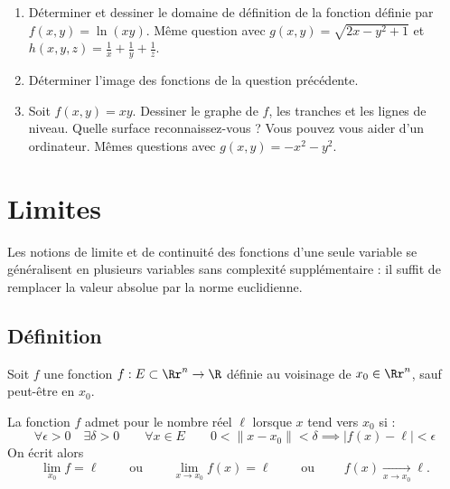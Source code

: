 \documentclass[11pt, class=report,crop=false]{standalone}
\begin{document}
 
\begin{miniexercices}
\sauteligne
\begin{enumerate}
  \item Déterminer et dessiner le domaine de définition de la fonction définie par $f(x,y) = \ln(xy)$.
  Même question avec $g(x,y) = \sqrt{2x-y^2+1}$ et $h(x,y,z) = \frac1x + \frac1y + \frac1z$.
   
  \item Déterminer l'image des fonctions de la question précédente.
  
  \item Soit $f(x,y) = xy$. Dessiner le graphe de $f$, les tranches et les lignes de niveau. Quelle surface reconnaissez-vous ? Vous pouvez vous aider d'un ordinateur. Mêmes questions avec $g(x,y) = -x^2-y^2$. 
  
\end{enumerate}
\end{miniexercices}


\section{Limites}


Les notions de limite et de continuité des fonctions d'une seule variable se généralisent en plusieurs variables sans complexité supplémentaire : il suffit de remplacer la valeur absolue par la norme euclidienne.


\subsection{Définition}



Soit $f$ une fonction $f: E \subset \Rr^n \to \R$ définie au voisinage de $x_0 \in \Rr^n$, sauf peut-être en $x_0$.

\begin{definition}
La fonction $f$ admet pour  le nombre réel $\ell$ lorsque $x$ tend vers $x_0$ si : 
$$\forall \epsilon >0 \quad \exists \delta > 0 \qquad
\forall x\in E  \qquad 
0< \| x-x_0 \| <\delta \implies | f(x)-\ell | < \epsilon
$$
On écrit alors 
$$\lim_{x_0} f = \ell \qquad \text{ ou }\qquad \lim_{x \to x_0} f(x) = \ell \qquad \text{ ou } \qquad f(x) \underset{x\to x_0}{\longrightarrow} \ell.$$
\end{definition}
\end{document}

